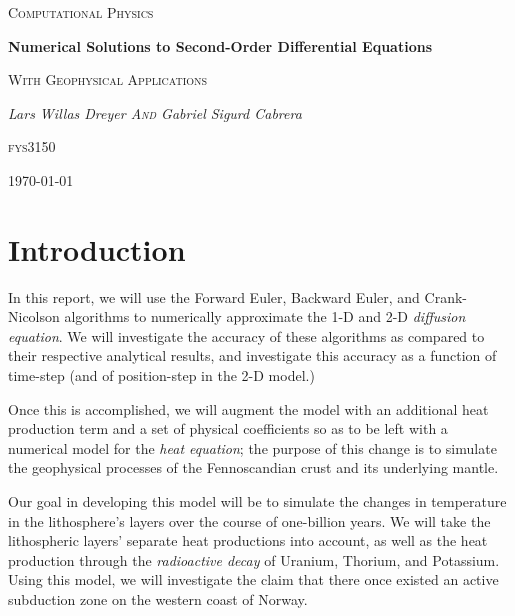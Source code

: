 \documentclass[a4paper,10pt,english]{article}
\begin{document}
\begin{titlepage}
	\centering
	{\scshape\LARGE Computational Physics \par}
	\vspace{1cm}
	{\huge\bfseries Numerical Solutions to Second-Order Differential Equations  \par}
	\vspace{1.5cm}
	{\scshape\Large With Geophysical Applications \par}
	\vspace{2cm}
	{\Large\itshape Lars Willas Dreyer \textsc{And} Gabriel Sigurd Cabrera\par}
	\vfill
	\textsc{fys}3150	\vfill

	{\large \today\par}
\end{titlepage}

\begin{abstract}

\end{abstract}

\section*{Introduction}

In this report, we will use the Forward Euler, Backward Euler, and Crank-Nicolson algorithms to numerically approximate the 1-D and 2-D \textit{diffusion equation}. We will investigate the accuracy of these algorithms as compared to their respective analytical results, and investigate this accuracy as a function of time-step (and of position-step in the 2-D model.)  

Once this is accomplished, we will augment the model with an additional heat production term and a set of physical coefficients so as to be left with a numerical model for the \textit{heat equation}; the purpose of this change is to simulate the geophysical processes of the Fennoscandian crust and its underlying mantle.  

Our goal in developing this model will be to simulate the changes in temperature in the lithosphere's layers over the course of one-billion years. We will take the lithospheric layers' separate heat productions into account, as well as the heat production through the \textit{radioactive decay} of Uranium, Thorium, and Potassium.  Using this model, we will investigate the claim that there once existed an active subduction zone on the western coast of Norway.
\end{document}
